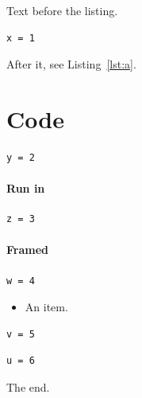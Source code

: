 \documentclass{article}
\begin{document}
Text before the listing.
\begin{lstlisting}[caption={A short caption},label=lst:a]
x = 1
\end{lstlisting}
After it, see Listing~\ref{lst:a}.
\section{Code}
\begin{lstlisting}[caption={Right after a heading}]
y = 2
\end{lstlisting}
\paragraph{Run in}
\begin{lstlisting}[caption={After a run-in heading}]
z = 3
\end{lstlisting}
\paragraph{Framed}
\begin{lstlisting}[frame=single,caption={Framed after a run-in heading}]
w = 4
\end{lstlisting}
\begin{itemize}
\item An item.
\end{itemize}
\begin{lstlisting}[caption={After a list, with a caption long enough that it no longer fits on one line and wraps}]
v = 5
\end{lstlisting}
\begin{lstlisting}[caption={Right after another listing},frame=tb]
u = 6
\end{lstlisting}
The end.
\end{document}
